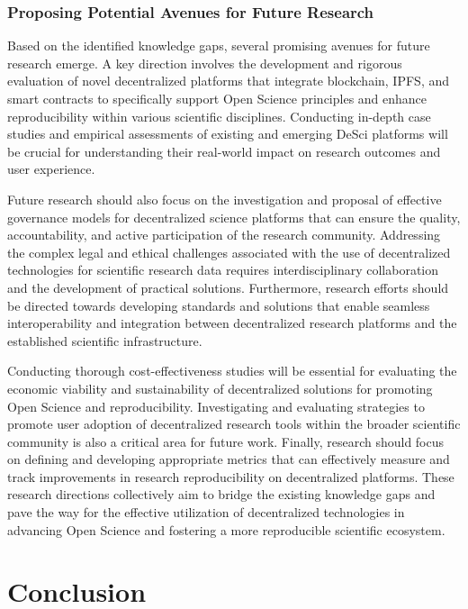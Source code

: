 \documentclass{article}
\begin{document}
\subsubsection{Proposing Potential Avenues for Future Research}

Based on the identified knowledge gaps, several promising avenues for future research emerge. A key direction involves the development and rigorous evaluation of novel decentralized platforms that integrate blockchain, IPFS, and smart contracts to specifically support Open Science principles and enhance reproducibility within various scientific disciplines. Conducting in-depth case studies and empirical assessments of existing and emerging DeSci platforms will be crucial for understanding their real-world impact on research outcomes and user experience.

Future research should also focus on the investigation and proposal of effective governance models for decentralized science platforms that can ensure the quality, accountability, and active participation of the research community. Addressing the complex legal and ethical challenges associated with the use of decentralized technologies for scientific research data requires interdisciplinary collaboration and the development of practical solutions. Furthermore, research efforts should be directed towards developing standards and solutions that enable seamless interoperability and integration between decentralized research platforms and the established scientific infrastructure.

Conducting thorough cost-effectiveness studies will be essential for evaluating the economic viability and sustainability of decentralized solutions for promoting Open Science and reproducibility. Investigating and evaluating strategies to promote user adoption of decentralized research tools within the broader scientific community is also a critical area for future work. Finally, research should focus on defining and developing appropriate metrics that can effectively measure and track improvements in research reproducibility on decentralized platforms. These research directions collectively aim to bridge the existing knowledge gaps and pave the way for the effective utilization of decentralized technologies in advancing Open Science and fostering a more reproducible scientific ecosystem.

\section{Conclusion}
\end{document}
